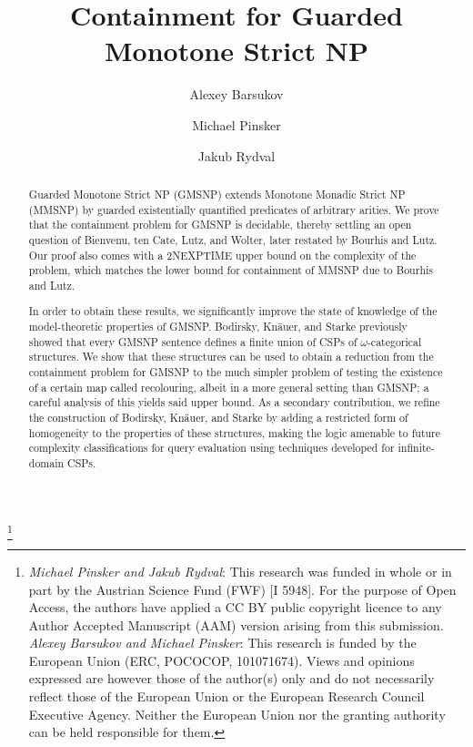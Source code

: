 \documentclass[oneside,reqno,12pt]{amsart}
\theoremstyle{plain}
\theoremstyle{remark}
\newcommand{\TWONEXPTIME}{{\textup{\textsf{2NEXPTIME}}}\xspace}
\begin{document}
\title[]{Containment for Guarded Monotone Strict NP}
 
 
 
\author{Alexey Barsukov} 
\author{Michael Pinsker}
\author{Jakub Rydval} 


\address{Faculty of Mathematics and Physics, Charles University, Prague, Czechia}

\address{Institut f\"{u}r Diskrete Mathematik und Geometrie, FG Algebra, TU Wien, Austria}
 
 

 \begin{abstract}   

 Guarded Monotone Strict NP (GMSNP) extends Monotone Monadic Strict NP (MMSNP) by guarded existentially quantified predicates of arbitrary arities.
We prove that the containment problem for GMSNP is decidable, thereby 
 settling an open question of Bienvenu, ten Cate, Lutz, and Wolter, later restated by Bourhis and Lutz.
Our proof also comes with a \TWONEXPTIME upper bound on the complexity of the problem, which matches the lower bound for containment of MMSNP due to Bourhis and Lutz. 
 
In order to obtain these results, we significantly improve the state of knowledge of the model-theoretic properties of GMSNP.
Bodirsky, Kn\"{a}uer, and Starke previously showed that every GMSNP sentence defines a finite union of CSPs of $\omega$-categorical structures. 
We show that these structures can be used to obtain a reduction from the containment problem for GMSNP to the
 much simpler problem of testing the existence of a certain map called recolouring, albeit in a more general setting than GMSNP; a careful analysis of this  yields said upper bound.
As a secondary contribution, we refine the construction of Bodirsky, Kn\"{a}uer, and Starke by adding a restricted form of homogeneity to the properties of these structures, making the logic amenable to future complexity classifications for query evaluation  using techniques developed for infinite-domain CSPs.
\end{abstract}  

 \thanks{\emph{Michael Pinsker and Jakub Rydval}: This research was funded in whole or in part by the Austrian Science Fund (FWF) [I 5948]. For the purpose of Open Access, the authors have applied a CC BY public copyright licence to any Author Accepted Manuscript (AAM) version arising from this submission. 
 \\ \emph{Alexey Barsukov and Michael Pinsker}: This research is  funded by the European Union (ERC, POCOCOP, 101071674). Views and opinions expressed are however those of the author(s) only and do not necessarily reflect those of the European Union or the European Research Council Executive Agency. Neither the European Union nor the granting authority can be held responsible for them.}
\end{document}
